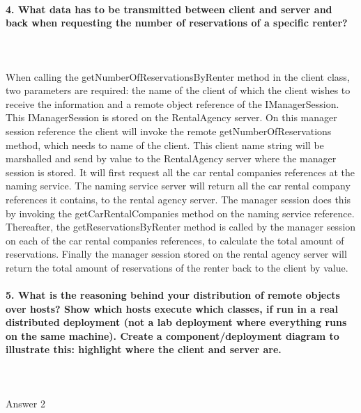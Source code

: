\documentclass{ds-report}
\begin{document}
	\paragraph{4. What data has to be transmitted between client and server and back when requesting the number of reservations of a specific renter?} \mbox{}\\\\
When calling the getNumberOfReservationsByRenter method in the client class, two parameters are required: the name of the client of which the client wishes to receive the information and a remote object reference of the IManagerSession. This IManagerSession is stored on the RentalAgency server. On this manager session reference the client will invoke the remote getNumberOfReservations method, which needs to name of the client. This client name string will be marshalled and send by value to the RentalAgency server where the manager session is stored. It will first request all the car rental companies references at the naming service. The naming service server will return all the car rental company references it contains, to the rental agency server. The manager session does this by invoking the getCarRentalCompanies method on the naming service reference.
Thereafter, the getReservationsByRenter method is called by the manager session on each of the car rental companies references, to calculate the total amount of reservations. Finally the manager session stored on the rental agency server will return the total amount of reservations of the renter back to the client by value.   


	\paragraph{5. What is the reasoning behind your distribution of remote objects over hosts? Show which hosts execute which classes, if run in a real distributed deployment (not a lab deployment where
everything runs on the same machine). Create a component/deployment diagram to illustrate this:
highlight where the client and server are.} \mbox{}\\\\
	Answer 2
\end{document}

